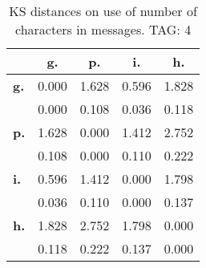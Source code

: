 \begin{table}[h!]
\begin{center}
\begin{tabular}{| l || c | c | c | c |}\hline
 & {\bf g.} & {\bf p.} & {\bf i.} & {\bf h.} \\\hline\hline
{\bf g.} & 0.000 & 1.628 & 0.596 & 1.828 \\
{\bf } & 0.000 & 0.108 & 0.036 & 0.118 \\\hline
{\bf p.} & 1.628 & 0.000 & 1.412 & 2.752 \\
{\bf } & 0.108 & 0.000 & 0.110 & 0.222 \\\hline
{\bf i.} & 0.596 & 1.412 & 0.000 & 1.798 \\
{\bf } & 0.036 & 0.110 & 0.000 & 0.137 \\\hline
{\bf h.} & 1.828 & 2.752 & 1.798 & 0.000 \\
{\bf } & 0.118 & 0.222 & 0.137 & 0.000 \\\hline
\end{tabular}
\caption{KS distances on use of number of characters in messages. TAG: 4}
\end{center}
\end{table}